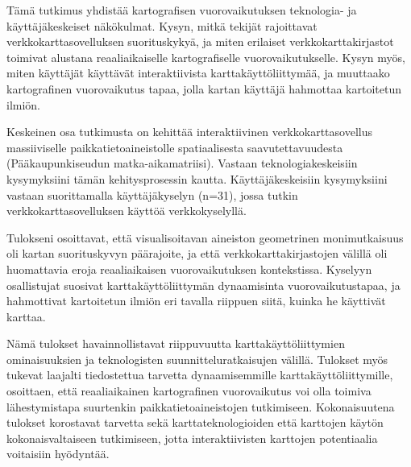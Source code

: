 \begin{spacing}{1}
Tämä tutkimus yhdistää kartografisen vuorovaikutuksen teknologia- ja käyttäjäkeskeiset näkökulmat.
Kysyn, mitkä tekijät rajoittavat verkkokarttasovelluksen suorituskykyä,
ja miten erilaiset verkkokarttakirjastot toimivat alustana reaaliaikaiselle kartografiselle vuorovaikutukselle.
Kysyn myös, miten käyttäjät käyttävät interaktiivista karttakäyttöliittymää,
ja muuttaako kartografinen vuorovaikutus tapaa, jolla kartan käyttäjä hahmottaa kartoitetun ilmiön.

Keskeinen osa tutkimusta on kehittää interaktiivinen verkkokarttasovellus
massiiviselle paikkatietoaineistolle spatiaalisesta saavutettavuudesta (Pääkaupunkiseudun matka-aikamatriisi).
Vastaan teknologiakeskeisiin kysymyksiini tämän kehitysprosessin kautta.
Käyttäjäkeskeisiin kysymyksiini vastaan suorittamalla käyttäjäkyselyn (n=31),
jossa tutkin verkkokarttasovelluksen käyttöä verkkokyselyllä.

Tulokseni osoittavat, että visualisoitavan aineiston geometrinen monimutkaisuus
oli kartan suorituskyvyn päärajoite, ja että verkkokarttakirjastojen välillä oli
huomattavia eroja reaaliaikaisen vuorovaikutuksen kontekstissa.
Kyselyyn osallistujat suosivat karttakäyttöliittymän dynaamisinta vuorovaikutustapaa,
ja hahmottivat kartoitetun ilmiön eri tavalla riippuen siitä, kuinka he käyttivät karttaa.

Nämä tulokset havainnollistavat riippuvuutta karttakäyttöliittymien ominaisuuksien
ja teknologisten suunnitteluratkaisujen välillä.
Tulokset myös tukevat laajalti tiedostettua tarvetta dynaamisemmille karttakäyttöliittymille,
osoittaen, että reaaliaikainen kartografinen vuorovaikutus voi olla toimiva lähestymistapa suurtenkin
paikkatietoaineistojen tutkimiseen.
Kokonaisuutena tulokset korostavat tarvetta
sekä karttateknologioiden että karttojen käytön kokonaisvaltaiseen tutkimiseen,
jotta interaktiivisten karttojen potentiaalia voitaisiin hyödyntää.

\end{spacing}
